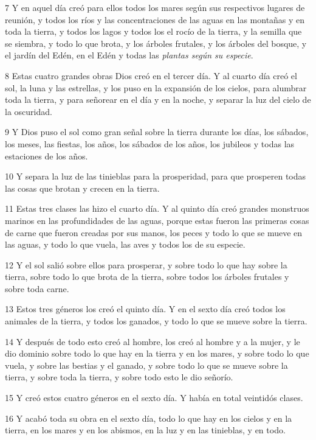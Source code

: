 \par 7 Y en aquel día creó para ellos todos los mares según sus respectivos lugares de reunión, y todos los ríos y las concentraciones de las aguas en las montañas y en toda la tierra, y todos los lagos y todos los el rocío de la tierra, y la semilla que se siembra, y todo lo que brota, y los árboles frutales, y los árboles del bosque, y el jardín del Edén, en el Edén y todas las \textit{plantas según su especie}.
\par 8 Estas cuatro grandes obras Dios creó en el tercer día. Y al cuarto día creó el sol, la luna y las estrellas, y los puso en la expansión de los cielos, para alumbrar toda la tierra, y para señorear en el día y en la noche, y separar la luz del cielo de la oscuridad.
\par 9 Y Dios puso el sol como gran señal sobre la tierra durante los días, los sábados, los meses, las fiestas, los años, los sábados de los años, los jubileos y todas las estaciones de los años.
\par 10 Y separa la luz de las tinieblas para la prosperidad, para que prosperen todas las cosas que brotan y crecen en la tierra.
\par 11 Estas tres clases las hizo el cuarto día. Y al quinto día creó grandes monstruos marinos en las profundidades de las aguas, porque estas fueron las primeras cosas de carne que fueron creadas por sus manos, los peces y todo lo que se mueve en las aguas, y todo lo que vuela, las aves y todos los de su especie.
\par 12 Y el sol salió sobre ellos para prosperar, y sobre todo lo que hay sobre la tierra, sobre todo lo que brota de la tierra, sobre todos los árboles frutales y sobre toda carne.
\par 13 Estos tres géneros los creó el quinto día. Y en el sexto día creó todos los animales de la tierra, y todos los ganados, y todo lo que se mueve sobre la tierra.
\par 14 Y después de todo esto creó al hombre, los creó al hombre y a la mujer, y le dio dominio sobre todo lo que hay en la tierra y en los mares, y sobre todo lo que vuela, y sobre las bestias y el ganado, y sobre todo lo que se mueve sobre la tierra, y sobre toda la tierra, y sobre todo esto le dio señorío.
\par 15 Y creó estos cuatro géneros en el sexto día. Y había en total veintidós clases.
\par 16 Y acabó toda su obra en el sexto día, todo lo que hay en los cielos y en la tierra, en los mares y en los abismos, en la luz y en las tinieblas, y en todo.
